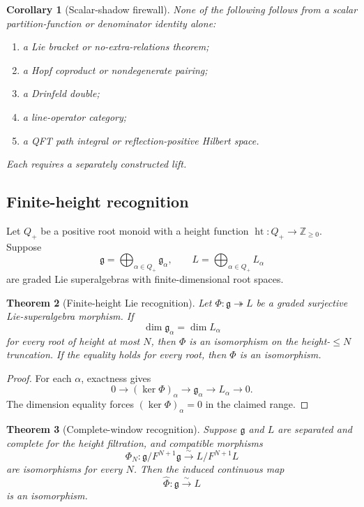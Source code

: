 \documentclass[11pt]{article}
\newtheorem{theorem}{Theorem}[section]
\newtheorem{corollary}[theorem]{Corollary}
\theoremstyle{definition}
\theoremstyle{remark}
\newcommand{\ZZ}{\mathbb Z}
\newcommand{\1}{\mathbf 1}
\newcommand{\cG}{\mathfrak g}
\begin{document}
\begin{corollary}[Scalar-shadow firewall]
None of the following follows from a scalar partition-function or denominator identity alone:
\begin{enumerate}[label=(\roman*)]
\item a Lie bracket or no-extra-relations theorem;
\item a Hopf coproduct or nondegenerate pairing;
\item a Drinfeld double;
\item a line-operator category;
\item a QFT path integral or reflection-positive Hilbert space.
\end{enumerate}
Each requires a separately constructed lift.
\end{corollary}

\subsection{Finite-height recognition}

Let $Q_+$ be a positive root monoid with a height function $\operatorname{ht}:Q_+\to\ZZ_{\geq0}$.  Suppose
\[
\cG=\bigoplus_{\alpha\in Q_+}\cG_\alpha,
\qquad
L=\bigoplus_{\alpha\in Q_+}L_\alpha
\]
are graded Lie superalgebras with finite-dimensional root spaces.

\begin{theorem}[Finite-height Lie recognition]
Let $\Phi:\cG\twoheadrightarrow L$ be a graded surjective Lie-superalgebra morphism.  If
\[
\dim \cG_\alpha=\dim L_\alpha
\]
for every root of height at most $N$, then $\Phi$ is an isomorphism on the height-$\leq N$ truncation.  If the equality holds for every root, then $\Phi$ is an isomorphism.
\end{theorem}

\begin{proof}
For each $\alpha$, exactness gives
\[
0\to(\ker\Phi)_\alpha\to\cG_\alpha\to L_\alpha\to0.
\]
The dimension equality forces $(\ker\Phi)_\alpha=0$ in the claimed range.
\end{proof}

\begin{theorem}[Complete-window recognition]
Suppose $\cG$ and $L$ are separated and complete for the height filtration, and compatible morphisms
\[
\Phi_N:\cG/F^{N+1}\cG\xrightarrow{\sim}L/F^{N+1}L
\]
are isomorphisms for every $N$.  Then the induced continuous map
\[
\widehat\Phi:\cG\xrightarrow{\sim}L
\]
is an isomorphism.
\end{theorem}
\end{document}
